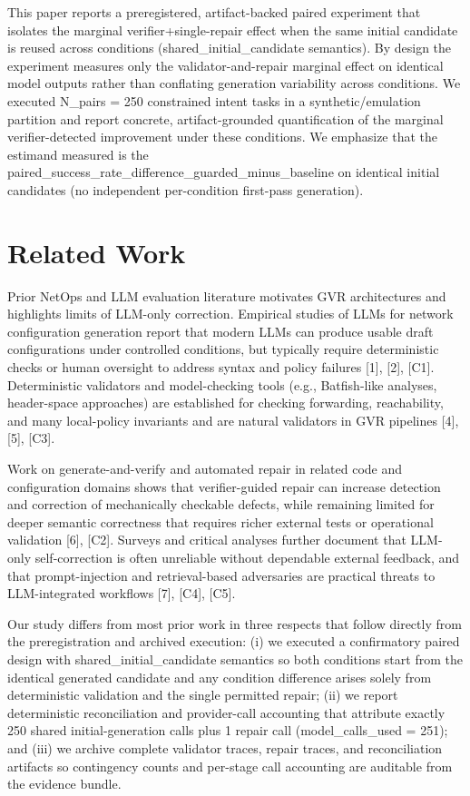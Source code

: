 \documentclass[conference]{IEEEtran}
\begin{document}
This paper reports a preregistered, artifact-backed paired experiment that isolates the marginal verifier+single-repair effect when the same initial candidate is reused across conditions (shared\_initial\_candidate semantics). By design the experiment measures only the validator-and-repair marginal effect on identical model outputs rather than conflating generation variability across conditions. We executed N\_pairs = 250 constrained intent tasks in a synthetic/emulation partition and report concrete, artifact-grounded quantification of the marginal verifier-detected improvement under these conditions. We emphasize that the estimand measured is the paired\_success\_rate\_difference\_guarded\_minus\_baseline on identical initial candidates (no independent per-condition first-pass generation).

\section{Related Work}
Prior NetOps and LLM evaluation literature motivates GVR architectures and highlights limits of LLM-only correction. Empirical studies of LLMs for network configuration generation report that modern LLMs can produce usable draft configurations under controlled conditions, but typically require deterministic checks or human oversight to address syntax and policy failures [1], [2], [C1]. Deterministic validators and model-checking tools (e.g., Batfish-like analyses, header-space approaches) are established for checking forwarding, reachability, and many local-policy invariants and are natural validators in GVR pipelines [4], [5], [C3].

Work on generate-and-verify and automated repair in related code and configuration domains shows that verifier-guided repair can increase detection and correction of mechanically checkable defects, while remaining limited for deeper semantic correctness that requires richer external tests or operational validation [6], [C2]. Surveys and critical analyses further document that LLM-only self-correction is often unreliable without dependable external feedback, and that prompt-injection and retrieval-based adversaries are practical threats to LLM-integrated workflows [7], [C4], [C5].

Our study differs from most prior work in three respects that follow directly from the preregistration and archived execution: (i) we executed a confirmatory paired design with shared\_initial\_candidate semantics so both conditions start from the identical generated candidate and any condition difference arises solely from deterministic validation and the single permitted repair; (ii) we report deterministic reconciliation and provider-call accounting that attribute exactly 250 shared initial-generation calls plus 1 repair call (model\_calls\_used = 251); and (iii) we archive complete validator traces, repair traces, and reconciliation artifacts so contingency counts and per-stage call accounting are auditable from the evidence bundle.
\end{document}
